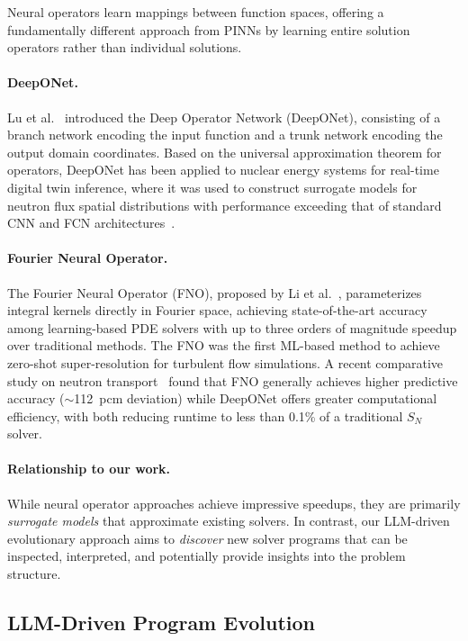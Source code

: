 Neural operators learn mappings between function spaces, offering a fundamentally different approach from PINNs by learning entire solution operators rather than individual solutions.

\paragraph{DeepONet.}
Lu et al.~\cite{lu2021deeponet} introduced the Deep Operator Network (DeepONet), consisting of a branch network encoding the input function and a trunk network encoding the output domain coordinates.
Based on the universal approximation theorem for operators, DeepONet has been applied to nuclear energy systems for real-time digital twin inference, where it was used to construct surrogate models for neutron flux spatial distributions with performance exceeding that of standard CNN and FCN architectures~\cite{kobayashi2024deeponet}.

\paragraph{Fourier Neural Operator.}
The Fourier Neural Operator (FNO), proposed by Li et al.~\cite{li2021fno}, parameterizes integral kernels directly in Fourier space, achieving state-of-the-art accuracy among learning-based PDE solvers with up to three orders of magnitude speedup over traditional methods.
The FNO was the first ML-based method to achieve zero-shot super-resolution for turbulent flow simulations.
A recent comparative study on neutron transport~\cite{sahadath2026neuralop} found that FNO generally achieves higher predictive accuracy ($\sim$112~pcm deviation) while DeepONet offers greater computational efficiency, with both reducing runtime to less than 0.1\% of a traditional $S_N$ solver.

\paragraph{Relationship to our work.}
While neural operator approaches achieve impressive speedups, they are primarily \emph{surrogate models} that approximate existing solvers.
In contrast, our LLM-driven evolutionary approach aims to \emph{discover} new solver programs that can be inspected, interpreted, and potentially provide insights into the problem structure.

\subsection{LLM-Driven Program Evolution}
\label{sec:rw_llmevo}

